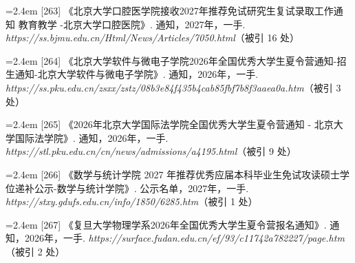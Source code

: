 {\vspace{0.6pt}
\vspace{3.5pt}\par
\nopagebreak\vspace{1pt}
\noindent\hangindent=2.4em \label{src:S0340}{\color{cAccent}[263]} 《北京大学口腔医学院接收2027年推荐免试研究生复试录取工作通知 教育教学 -北京大学口腔医院》. 通知，2027年，一手. \textit{https://ss.bjmu.edu.cn/Html/News/Articles/7050.html}（被引 16 处）\par
\vspace{0.6pt}
\vspace{3.5pt}\par
\nopagebreak\vspace{1pt}
\noindent\hangindent=2.4em \label{src:S0341}{\color{cAccent}[264]} 《北京大学软件与微电子学院2026年全国优秀大学生夏令营通知-招生通知-北京大学软件与微电子学院》. 通知，2026年，一手. \textit{https://ss.pku.edu.cn/zsxx/zstz/08b3e84f435b4cab85fbf7b8f3aaea0a.htm}（被引 3 处）\par
\vspace{0.6pt}
\noindent\hangindent=2.4em \label{src:S0342}{\color{cAccent}[265]} 《2026年北京大学国际法学院全国优秀大学生夏令营通知 - 北京大学国际法学院》. 通知，2026年，一手. \textit{https://stl.pku.edu.cn/cn/news/admissions/a4195.html}（被引 9 处）\par
\vspace{0.6pt}
\vspace{3.5pt}\par
\nopagebreak\vspace{1pt}
\noindent\hangindent=2.4em \label{src:S0343}{\color{cAccent}[266]} 《数学与统计学院 2027 年推荐优秀应届本科毕业生免试攻读硕士学位递补公示-数学与统计学院》. 公示名单，2027年，一手. \textit{https://stxy.gdufs.edu.cn/info/1850/6285.htm}（被引 1 处）\par
\vspace{0.6pt}
\vspace{3.5pt}\par
\nopagebreak\vspace{1pt}
\noindent\hangindent=2.4em \label{src:S0344}{\color{cAccent}[267]} 《复旦大学物理学系2026年全国优秀大学生夏令营报名通知》. 通知，2026年，一手. \textit{https://surface.fudan.edu.cn/ef/93/c11742a782227/page.htm}（被引 2 处）\par
}
